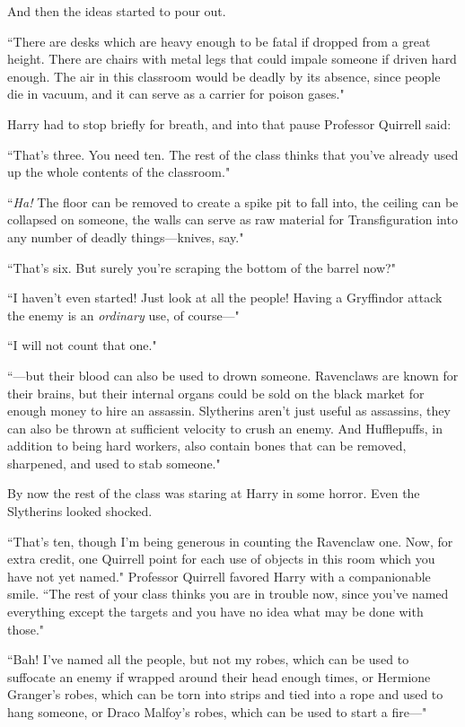 And then the ideas started to pour out.

``There are desks which are heavy enough to be fatal if dropped from a great height. There are chairs with metal legs that could impale someone if driven hard enough. The air in this classroom would be deadly by its absence, since people die in vacuum, and it can serve as a carrier for poison gases."

Harry had to stop briefly for breath, and into that pause Professor Quirrell said:

``That's three. You need ten. The rest of the class thinks that you've already used up the whole contents of the classroom."

``\emph{Ha!} The floor can be removed to create a spike pit to fall into, the ceiling can be collapsed on someone, the walls can serve as raw material for Transfiguration into any number of deadly things—knives, say."

``That's six. But surely you're scraping the bottom of the barrel now?"

``I haven't even started! Just look at all the people! Having a Gryffindor attack the enemy is an \emph{ordinary} use, of course—"

``I will not count that one."

``—but their blood can also be used to drown someone. Ravenclaws are known for their brains, but their internal organs could be sold on the black market for enough money to hire an assassin. Slytherins aren't just useful as assassins, they can also be thrown at sufficient velocity to crush an enemy. And Hufflepuffs, in addition to being hard workers, also contain bones that can be removed, sharpened, and used to stab someone."

By now the rest of the class was staring at Harry in some horror. Even the Slytherins looked shocked.

``That's ten, though I'm being generous in counting the Ravenclaw one. Now, for extra credit, one Quirrell point for each use of objects in this room which you have not yet named." Professor Quirrell favored Harry with a companionable smile. ``The rest of your class thinks you are in trouble now, since you've named everything except the targets and you have no idea what may be done with those."

``Bah! I've named all the people, but not my robes, which can be used to suffocate an enemy if wrapped around their head enough times, or Hermione Granger's robes, which can be torn into strips and tied into a rope and used to hang someone, or Draco Malfoy's robes, which can be used to start a fire—"

